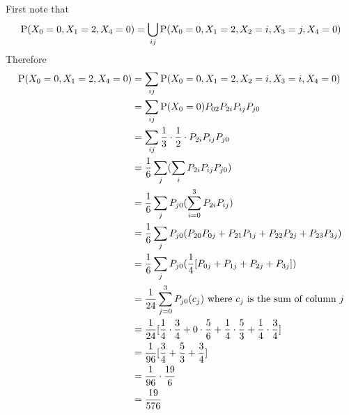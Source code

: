 \documentclass[12pt]{article}
\begin{document}
First note that $$\mathrm{P}( X_0=0,X_1=2,X_4=0 ) = \bigcup_{ij} \mathrm{P}( X_0=0,X_1=2,X_2=i,X_3=j,X_4=0 ) $$ 
Therefore $$ \begin{aligned} \mathrm{P}( X_0=0,X_1=2,X_4=0 ) &= \sum_{ij} \mathrm{P}( X_0=0,X_1=2,X_2=i,X_3=i,X_4=0 ) \\ &= \sum_{ij} \mathrm{P}( X_0=0 ) P_{02}P_{2i}P_{ij}P_{j0} \\ &= \sum_{ij} \frac{1}{3} \cdot \frac{1}{2} \cdot P_{2i} P_{ij} P_{j0} \\ &= \frac{1}{6} \sum_j (\sum_i P_{2i}P_{ij}P_{j0}) \\ &= \frac{1}{6} \sum_j P_{j0}(\sum_{i=0}^3 P_{2i}P_{ij}) \\ &=\frac{1}{6} \sum_j P_{j0} (P_{20}P_{0j} + P_{21}P_{1j} + P_{22}P_{2j} + P_{23}P_{3j}) \\ &= \frac{1}{6} \sum_j P_{j0} (\frac{1}{4}[P_{0j} + P_{1j} + P_{2j} + P_{3j}]) \\ &= \frac{1}{24}\sum_{j=0}^3 P_{j0}(c_j) \text{ where $c_j$ is the sum of column $j$} \\ &= \frac{1}{24}[\frac{1}{4} \cdot \frac{3}{4} + 0 \cdot \frac{5}{6} + \frac{1}{4} \cdot \frac{5}{3} + \frac{1}{4} \cdot \frac{3}{4}] \\ &= \frac{1}{96}[\frac{3}{4} + \frac{5}{3} + \frac{3}{4}] \\ &= \frac{1}{96} \cdot \frac{19}{6} \\ &= \frac{19}{576} \end{aligned} $$ 
\end{document}
